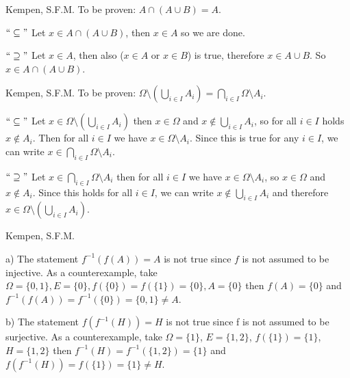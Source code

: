 \begin{solution}[1.2]{Kempen, S.F.M.} To be proven: $A\cap (A\cup B) = A$. 

\noindent $``\subseteq"$ Let $x\in A\cap (A\cup B)$, then $x\in A$ so we are done.

\noindent $``\supseteq"$ Let $x\in A$, then also ($x\in A$ or $x\in B$) is true, therefore $x\in A\cup B$. So $x\in A\cap (A\cup B)$. 
\end{solution}

\begin{solution}[1.5]{Kempen, S.F.M.} To be proven: $\Omega \setminus \left(\bigcup_{i\in I} A_i \right) = \bigcap_{i\in I} \Omega \setminus A_i$. 

\noindent $``\subseteq"$ Let $x\in \Omega \setminus \left(\bigcup_{i\in I} A_i \right)$ then $x\in \Omega$ and $x\notin \bigcup_{i\in I} A_i$, so for all $i \in I $ holds $x\notin A_i$. Then for all $i \in I$ we have $x\in \Omega\setminus A_i$. Since this is true for any $i\in I$, we can write $x\in \bigcap_{i\in I} \Omega \setminus A_i$. 

\noindent $``\supseteq"$ Let $x\in \bigcap_{i\in I} \Omega \setminus A_i$ then for all $i\in I$ we have $x\in \Omega\setminus A_i$, so $x\in \Omega$ and $x\notin A_i$. Since this holds for all $i\in I$, we can write $x\notin \bigcup_{i\in I} A_i $ and therefore $x\in \Omega \setminus \left(\bigcup_{i\in I} A_i \right)$.
\end{solution}

\begin{solution}[1.8]{Kempen, S.F.M.} 
    
\noindent a) The statement $f^{-1}(f(A)) = A$ is not true since $f$ is not assumed to be injective. As a counterexample, take $\Omega = \{0,1\}, E = \{0\}, f(\{0\}) = f(\{1\}) = \{0\}, A = \{0\}$ then $f(A) = \{0\}$ and $f^{-1}(f(A)) = f^{-1}(\{0\}) = \{0,1\} \neq A$.

\noindent b) The statement $f(f^{-1}(H)) = H$ is not true since f is not assumed to be surjective. As a counterexample, take $\Omega = \{1\}$, $E = \{1,2\}$, $f(\{1\}) = \{1\}$, $H = \{1,2\}$ then $f^{-1}(H) = f^{-1}(\{1,2\}) = \{1\}$ and $f(f^{-1}(H)) = f(\{1\}) = \{1\} \neq H$.
\end{solution}

